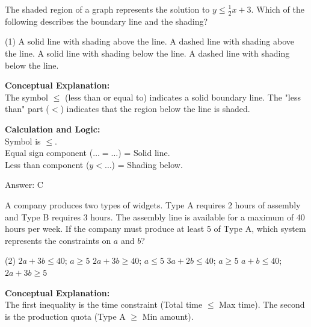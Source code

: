 \documentclass[11pt,paper=a4,answers]{exam}
\begin{document}
\begin{questions}
\vspace{20pt}

\question
The shaded region of a graph represents the solution to $y \le \frac{1}{2}x + 3$. Which of the following describes the boundary line and the shading?
\begin{tasks}(1)
    \task A solid line with shading above the line.
    \task A dashed line with shading above the line.
    \task A solid line with shading below the line.
    \task A dashed line with shading below the line.
\end{tasks}

\begin{solution}
\textbf{Conceptual Explanation:} \\
The symbol $\le$ (less than or equal to) indicates a solid boundary line. The "less than" part ($<$) indicates that the region below the line is shaded.

\vspace{10pt}
\textbf{Calculation and Logic:} \\
Symbol is $\le$. \\
Equal sign component ($\dots = \dots$) = Solid line. \\
Less than component ($y < \dots$) = Shading below.

\vspace{15pt}
Answer: \colorbox{yellow!100}{C}
\end{solution}

\vspace{20pt}

\question
A company produces two types of widgets. Type A requires 2 hours of assembly and Type B requires 3 hours. The assembly line is available for a maximum of 40 hours per week. If the company must produce at least 5 of Type A, which system represents the constraints on $a$ and $b$?
\begin{tasks}(2)
    \task $2a + 3b \le 40$; $a \ge 5$
    \task $2a + 3b \ge 40$; $a \le 5$
    \task $3a + 2b \le 40$; $a \ge 5$
    \task $a + b \le 40$; $2a + 3b \ge 5$
\end{tasks}

\begin{solution}
\textbf{Conceptual Explanation:} \\
The first inequality is the time constraint (Total time $\le$ Max time). The second is the production quota (Type A $\ge$ Min amount).


\end{solution}
\end{questions}
\end{document}
